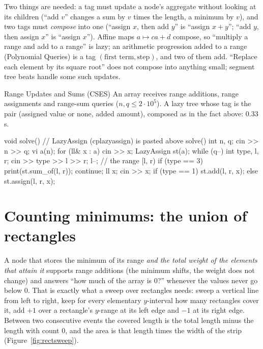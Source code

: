 \begin{fact}
Two things are needed: a tag must update a node's aggregate without looking at its children (``add $v$'' changes a sum by $v$ times the
length, a minimum by $v$), and two tags must \emph{compose} into one (``assign $x$, then add $y$'' is ``assign $x + y$''; ``add $y$,
then assign $x$'' is ``assign $x$''). Affine maps $a \mapsto ca + d$ compose, so ``multiply a range and add to a range'' is lazy; an
arithmetic progression added to a range (Polynomial Queries) is a tag $(\text{first term}, \text{step})$, and two of them add. ``Replace
each element by its square root'' does not compose into anything small; segment tree beats handle some such updates.
\end{fact}

\begin{problem}{Range Updates and Sums (CSES)}
An array receives range additions, range assignments and range-sum queries ($n, q \le 2 \cdot 10^5$).
\solution A lazy tree whose tag is the pair (assigned value or none, added amount), composed as in the fact above: 0.33\,s.
\end{problem}

\begin{code}
void solve() {  // LazyAssign (cplazyassign) is pasted above solve()
    int n, q;
    cin >> n >> q;
    vi a(n);
    for (ll& x : a) cin >> x;
    LazyAssign st(a);
    while (q--) {
        int type, l, r;
        cin >> type >> l >> r;
        l--;  // the range [l, r)
        if (type == 3) {
            print(st.sum_of(l, r));
            continue;
        }
        ll x;
        cin >> x;
        if (type == 1) st.add(l, r, x);
        else st.assign(l, r, x);
    }
}
\end{code}


\section[Counting minimums]{Counting minimums: the union of rectangles \hfill \plat}\label{sec:mincount}

A node that stores the minimum of its range \emph{and the total weight of the elements that attain it} supports range additions (the
minimum shifts, the weight does not change) and answers ``how much of the array is 0?'' whenever the values never go below 0. That is
exactly what a sweep over rectangles needs: sweep a vertical line from left to right, keep for every elementary $y$-interval how many
rectangles cover it, add $+1$ over a rectangle's $y$-range at its left edge and $-1$ at its right edge. Between two consecutive events
the covered length is the total length minus the length with count 0, and the area is that length times the width of the strip
(Figure~\ref{fig:rectsweep}).

